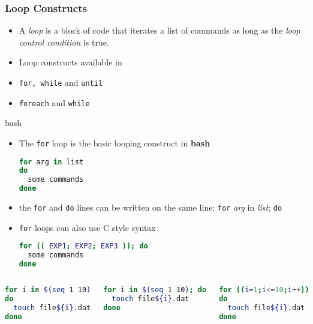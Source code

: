 \documentclass[slidestop,mathserif,compress,xcolor=svgnames]{beamer}
\newenvironment{eblock}[0]
{
\begin{beamerboxesrounded}[upper=uppercol2,lower=lowercol2,shadow=true]}
{\end{beamerboxesrounded}}
\begin{document}
\begin{frame}
  \frametitle{\small Loop Constructs}
  \begin{itemize}
    \item A \textit{loop} is a block of code that iterates a list of commands as long as the \textit{loop control condition} is true.
    \item Loop constructs available in 
    \item[\textbf{bash}:] \texttt{for, while} and \texttt{until}
    \item[\textbf{tcsh}:] \texttt{foreach} and \texttt{while}
  \end{itemize}
  \framebreak
  \begin{eblock}{bash}
    \begin{itemize}
      \item The \texttt{for} loop is the basic looping construct in \textbf{bash}
      \begin{lstlisting}[language=bash]
for arg in list
do
  some commands
done
      \end{lstlisting}
      \item the \texttt{for} and \texttt{do} lines can be written on the same line: \texttt{for} \textit{arg} in \textit{list}; \texttt{do}
      \item \texttt{for} loops can also use C style syntax
      \begin{lstlisting}[language=bash]
for (( EXP1; EXP2; EXP3 )); do
  some commands
done
      \end{lstlisting}
    \end{itemize}
  \end{eblock}
  \begin{columns}
    \begin{eblock}{}
      \begin{lstlisting}[language=bash]
for i in $(seq 1 10)
do
  touch file${i}.dat
done
      \end{lstlisting}
    \end{eblock}
    \begin{eblock}{}
      \begin{lstlisting}[language=bash]
for i in $(seq 1 10); do
  touch file${i}.dat
done
      \end{lstlisting}
    \end{eblock}
    \begin{eblock}{}
      \begin{lstlisting}[language=bash]
for ((i=1;i<=10;i++))
do
  touch file${i}.dat
done
      \end{lstlisting}
    \end{eblock}
  \end{columns}


\end{frame}
\end{document}
